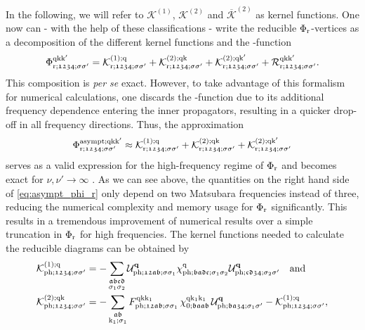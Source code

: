 \documentclass[../../main.tex]{subfiles}
\begin{document}
In the following, we will refer to $\mathcal{K}^{(1)}$, $\mathcal{K}^{(2)}$ and $\overline{\mathcal{K}}^{(2)}$ as kernel functions. One now can - with the help of these classifications - write the reducible $\Phi_{\text{r}}$-vertices as a decomposition of the different kernel functions and the -function
\begin{align}
	\Phi_{\text{r};\mathfrak{1234};\sigma\sigma'}^{\text{q}\text{k}\text{k}'}=\mathcal{K}^{(1);\text{q}}_{\text{r};\mathfrak{1234};\sigma\sigma'}+\mathcal{K}^{(2);\text{q}\text{k}}_{\text{r};\mathfrak{1234};\sigma\sigma'}+\mathcal{K}^{(2);\text{q}\text{k}'}_{\text{r};\mathfrak{1234};\sigma\sigma'}+\mathcal{R}^{\text{q}\text{k}\text{k}'}_{\text{r};\mathfrak{1234};\sigma\sigma'}.
\end{align}
This composition is \textit{per se} exact. However, to take advantage of this formalism for numerical calculations, one discards the -function due to its additional frequency dependence entering the inner propagators, resulting in a quicker drop-off in all frequency directions. Thus, the approximation
\begin{align}\label{eq:asympt_phi_r}
	\Phi_{\text{r};\mathfrak{1234};\sigma\sigma'}^{\text{asympt};\text{q}\text{k}\text{k}'}\approx\mathcal{K}^{(1);\text{q}}_{\text{r};\mathfrak{1234};\sigma\sigma'}+\mathcal{K}^{(2);\text{q}\text{k}}_{\text{r};\mathfrak{1234};\sigma\sigma'}+\mathcal{K}^{(2);\text{q}\text{k}'}_{\text{r};\mathfrak{1234};\sigma\sigma'}
\end{align}
serves as a valid expression for the high-frequency regime of $\Phi_{\text{r}}$ and becomes exact for $\nu,\nu'\to\infty$ \cite{high-freq asympt}. As we can see above, the quantities on the right hand side of \eqref{eq:asympt_phi_r} only depend on two Matsubara frequencies instead of three, reducing the numerical complexity and memory usage for $\Phi_{\text{r}}$ significantly. This results in a tremendous improvement of numerical results over a simple truncation in $\Phi_{\text{r}}$ for high frequencies. The kernel functions needed to calculate the reducible diagrams can be obtained by \cite{towards ab initio dga}
\begin{align}
	\mathcal{K}^{(1);\text{q}}_{\text{ph};\mathfrak{1234};\sigma\sigma'}&=-\sum_{\substack{\mathfrak{abcd}\\\sigma_1\sigma_2}} \mathcal{U}^{\textbf{q}}_{\text{ph};\mathfrak{12ab};\sigma\sigma_1}\chi^{\text{q}}_{\text{ph};\mathfrak{badc};\sigma_1\sigma_2}\mathcal{U}^{\textbf{q}}_{\text{ph};\mathfrak{cd34};\sigma_2\sigma'}\quad\text{and}\label{eq:kernel_1}\\
	\mathcal{K}^{(2);\text{q}\text{k}}_{\text{ph};\mathfrak{1234};\sigma\sigma'}&=-\sum_{\substack{\mathfrak{ab}\\\text{k}_1;\sigma_1}} F^{\text{q}\text{k}\text{k}_1}_{\text{ph};\mathfrak{12ab};\sigma\sigma_1}\,\chi^{\text{q}\text{k}_1\text{k}_1}_{0;\mathfrak{baab}}\,\mathcal{U}^{\textbf{q}}_{\text{ph};\mathfrak{ba34};\sigma_1\sigma'}-\mathcal{K}^{(1);\text{q}}_{\text{ph};\mathfrak{1234};\sigma\sigma'},\label{eq:kernel_2}
\end{align}
\end{document}
